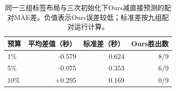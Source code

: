 \begin{table}[t]
\centering\footnotesize\setlength{\tabcolsep}{3pt}
\caption{同一三组标签布局与三次初始化下Ours减直接预测的配对MAE差。负值表示Ours误差较低；标准差按九组配对运行计算。}\label{tab:paired}
\begin{tabular}{lrrr}\toprule
预算 & 平均差值（秒） & 标准差（秒） & Ours胜出数\\\midrule
1\% & -0.579 & 0.624 & 8/9\\
5\% & -0.075 & 0.353 & 6/9\\
10\% & +0.295 & 0.169 & 0/9\\
\bottomrule\end{tabular}
\end{table}
